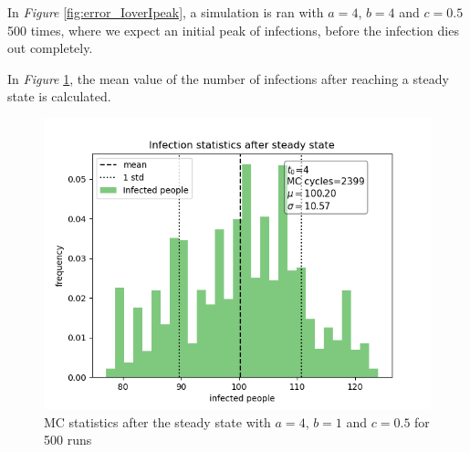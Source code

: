 In \textit{Figure} \ref{fig:error_IoverIpeak}, a simulation is ran with $a=4$, $b=4$ and $c=0.5$ 500 times, where we expect an initial peak of infections, before the infection dies out completely.

In \textit{Figure} \ref{fig:error_meanI}, the mean value of the number of infections after reaching a steady state is calculated.

\begin{figure}[H]
    \centering
    \includegraphics[scale=0.55]{plots/MC_solver_error_a_4_b_1_c_0.5I_SS_mcs_2399.png}
    \caption{MC statistics after the steady state with $a=4$, $b=1$ and $c=0.5$ for 500 runs}
    \label{fig:error_meanI}
\end{figure}

